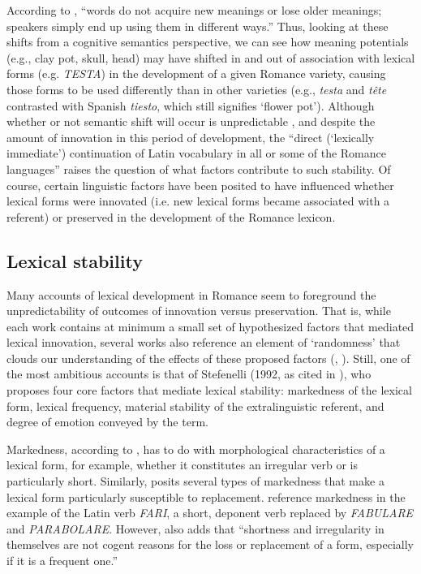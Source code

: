 \documentclass[output=paper,colorlinks,citecolor=brown,
]{langscibook}
\begin{document}
According to \citet[50]{dworkin_recent_2006}, “words do not acquire new meanings or lose older meanings; speakers simply end up using them in different ways.” Thus, looking at these shifts from a cognitive semantics perspective, we can see how meaning potentials (e.g., clay pot, skull, head) may have shifted in and out of association with lexical forms (e.g. \textit{TESTA}) in the development of a given Romance variety, causing those forms to be used differently than in other varieties (e.g., \textit{testa} and \textit{tête} contrasted with Spanish \textit{tiesto}, which still signifies ‘flower pot’). Although whether or not semantic shift will occur is unpredictable \citep[51]{dworkin_recent_2006}, and despite the amount of innovation in this period of development, the “direct (‘lexically immediate’) continuation of Latin vocabulary in all or some of the Romance languages” \citep[564]{stefenelli_lexical_2011} raises the question of what factors contribute to such stability. Of course, certain linguistic factors have been posited to have influenced whether lexical forms were innovated (i.e. new lexical forms became associated with a referent) or preserved in the development of the Romance lexicon.

\subsection{Lexical stability}
Many accounts of lexical development in Romance seem to foreground the unpredictability of outcomes of innovation versus preservation. That is, while each work contains at minimum a small set of hypothesized factors that mediated lexical innovation, several works also reference an element of ‘randomness’ that clouds our understanding of the effects of these proposed factors (\citealt[254]{glessgen_linguistique_2007}, \citealt[325]{posner_romance_1996}). Still, one of the most ambitious accounts is that of Stefenelli (1992, as cited in \citealt{stefenelli_lexical_2011}), who proposes four core factors that mediate lexical stability: markedness of the lexical form, lexical frequency, material stability of the extralinguistic referent, and degree of emotion conveyed by the term.

Markedness, according to \citet[580]{stefenelli_lexical_2011}, has to do with morphological characteristics of a lexical form, for example, whether it constitutes an irregular verb or is particularly short. Similarly, \citet[255]{glessgen_linguistique_2007} posits several types of markedness that make a lexical form particularly susceptible to replacement. \citet[288]{alkire_romance_2010} reference markedness in the example of the Latin verb \textit{FARI}, a short, deponent verb replaced by \textit{FABULARE} and \textit{PARABOLARE}. However, \citet[580]{stefenelli_lexical_2011} also adds that “shortness and irregularity in themselves are not cogent reasons for the loss or replacement of a form, especially if it is a frequent one.”
\end{document}
